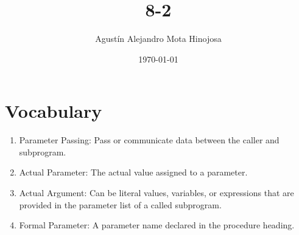 \documentclass[11pt]{article}
\author{Agustín Alejandro Mota Hinojosa}
\date{\today}
\title{8-2}
\begin{document}
\maketitle
\tableofcontents

\section{Vocabulary}
\label{sec:orgad1d907}
\begin{enumerate}
\item Parameter Passing: Pass or communicate data between the caller and subprogram.
\item Actual Parameter: The actual value assigned to a parameter.
\item Actual Argument: Can be literal values, variables, or expressions that are provided in the parameter list of a called subprogram.
\item Formal Parameter: A parameter name declared in the procedure heading.
\end{enumerate}
\end{document}
